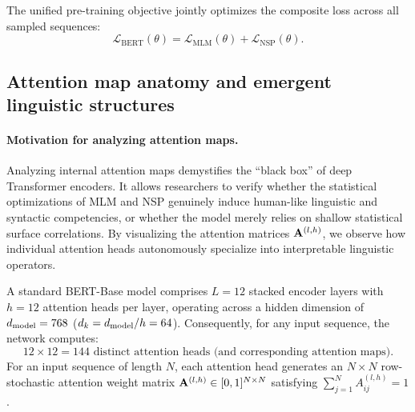 \documentclass[../../main.tex]{subfiles}
\begin{document}
The unified pre-training objective jointly optimizes the composite loss across all sampled sequences:
\begin{equation}
\label{eq:bert_total_pretraining_objective}
\mathcal{L}_{\text{BERT}}(\theta) = \mathcal{L}_{\text{MLM}}(\theta) + \mathcal{L}_{\text{NSP}}(\theta).
\end{equation}

\subsection{Attention map anatomy and emergent linguistic structures}
\label{subsec:bert_attention_map_anatomy}

\paragraph{Motivation for analyzing attention maps.}
Analyzing internal attention maps demystifies the ``black box'' of deep Transformer encoders. It allows researchers to verify whether the statistical optimizations of MLM and NSP genuinely induce human-like linguistic and syntactic competencies, or whether the model merely relies on shallow statistical surface correlations. By visualizing the attention matrices $\mathbf{A}^{(l, h)}$, we observe how individual attention heads autonomously specialize into interpretable linguistic operators.

A standard BERT-Base model comprises $L = 12$ stacked encoder layers with $h = 12$ attention heads per layer, operating across a hidden dimension of $d_{\text{model}} = 768$ ($d_k = d_{\text{model}} / h = 64$). Consequently, for any input sequence, the network computes:
\begin{equation}
\label{eq:bert_total_attention_heads}
12 \times 12 = 144 \text{ distinct attention heads (and corresponding attention maps)}.
\end{equation}
For an input sequence of length $N$, each attention head generates an $N \times N$ row-stochastic attention weight matrix $\mathbf{A}^{(l, h)} \in [0, 1]^{N \times N}$ satisfying $\sum_{j=1}^N A_{ij}^{(l, h)} = 1$.
\end{document}
